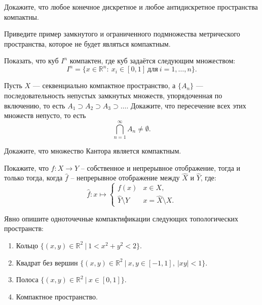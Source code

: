 	

\begin{task}
	Докажите, что любое конечное дискретное и любое антидискретное пространства компактны.
\end{task}

\begin{task}
	Приведите пример замкнутого и ограниченного подмножества метрического пространства, которое не будет являться компактным.
\end{task}

\begin{task}
	Показать, что куб \(I^n\) компактен, где куб задаётся следующим множеством: 
	\[
		I^n = \{x \in \mathbb{R}^n: \ x_i \in \left[0, 1\right] \ \text{для} \ i=1,\dots,n\}.
	\]
\end{task}

\begin{task}
    Пусть \( X \) — секвенциально компактное пространство, а \( \{A_n\} \) — последовательность непустых замкнутых множеств, упорядоченная по включению, то есть \( A_1 \supset A_2 \supset A_3 \supset \dots \). Докажите, что пересечение всех этих множеств непусто, то есть
    \[
    \bigcap_{n=1}^{\infty} A_n \neq \emptyset.
    \]
\end{task}

\begin{task}
    Докажите, что множество Кантора является компактным.
\end{task}

\begin{task}
	Покажите, что \(f: X \to Y\) -- собственное и непрерывное отображение, тогда и только тогда, когда \(\hat{f}\) -- непрерывное отображение между \(\hat{X}\) и \(\hat{Y}\), где:
	\begin{equation*}
		\hat{f}: x \mapsto \begin{cases}
			f(x) & x \in X, \\
			\hat{Y} \setminus Y & x = \hat{X} \setminus X.
		\end{cases}
	\end{equation*}
\end{task}

\begin{task}
	Явно опишите одноточечные компактификации следующих топологических пространств:
	\begin{enumerate}
		\item Кольцо \( \{(x, y) \in \mathbb{R}^2 \ | \ 1 < x^2 + y^2 < 2\} \).
		\item Квадрат без вершин \( \{(x, y) \in \mathbb{R}^2 \ | \ x, y \in [-1, 1], \ |xy| < 1\} \).
		\item Полоса \( \{(x, y) \in \mathbb{R}^2 \ | \ x \in [0, 1]\} \).
		\item Компактное пространство.
	\end{enumerate}
\end{task}	